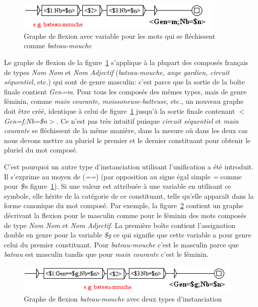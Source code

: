 \begin{figure}[!htb]
  \centering
  \includegraphics[width=10cm]{resources/img/BateauMouche2.png}
  \caption{Graphe de flexion avec variable pour les mots qui se fléchissent comme
  \emph{bateau-mouche}}
  \label{fig:BateauMouche2}
\end{figure}

\bigskip
\noindent Le graphe de flexion de la figure~\ref{fig:BateauMouche2} s'applique à la plupart des
composés français de types \emph{Nom Nom} et \emph{Nom Adjectif} (\emph{bateau-mouche, ange
gardien, circuit séquentiel}, etc.) qui sont de genre masculin: c'est parce que la sortie de la 
boîte finale contient \emph{Gen=m}. Pour tous les composés des mêmes types, mais de genre féminin,
comme \emph{main courante, moissoneuse-batteuse}, etc., un nouveau graphe doit être créé, identique
à celui de figure~\ref{fig:BateauMouche2} jusqu'à la sortie finale contenant
\emph{$<$Gen=f;Nb=\$n$>$}.
Ce n'est pas très intuitif puisque \emph{circuit séquentiel} et \emph{main courante} se fléchissent
de la même manière, dans la mesure où dans les deux cas nous devons mettre au pluriel le premier et
le dernier constituant pour obtenir le pluriel du mot composé.

\bigskip
\noindent C'est pourquoi un autre type d'instanciation utilisant l'unification a été introduit. 
Il s'exprime au moyen de (\emph{==}) (par opposition au signe égal simple \emph{=} comme pour
\emph{\$n} figure~\ref{fig:BateauMouche2}).
Si une valeur est attribuée à une variable en utilisant ce symbole, elle hérite de la catégorie de
ce constituant, telle qu'elle apparaît dans la forme canonique du mot composé. Par exemple, la
figure~\ref{fig:BateauMouche3} contient un graphe décrivant la flexion pour le masculin comme pour
le féminin des mots composés de type \emph{Nom Nom} et \emph{Nom Adjectif}. La première boîte
contient l'assignation double en genre pour la variable \emph{\$g} ce qui signifie que cette
variable a pour genre celui du premier constituant. Pour \emph{bateau-mouche} c'est le masculin
parce que \emph{bateau} est masculin tandis que pour \emph{main courante} c'est le féminin. 

\begin{figure}[!htb]
  \centering
  \includegraphics[width=11cm]{resources/img/BateauMouche3.png}
  \caption{Graphe de flexion \emph{bateau-mouche} avec deux types d'instanciation}
  \label{fig:BateauMouche3}
\end{figure}

